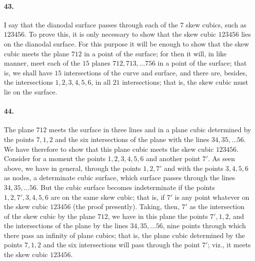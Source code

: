 \documentclass[11pt,a4paper]{article}
\begin{document}
\paragraph{43.}
I say that the dianodal surface passes through each of the $7$ skew cubics, such as
$123456$. To prove this, it is only necessary to show that the skew cubic $123456$ lies on
the dianodal surface. For this purpose it will be enough to show that the skew cubic meets
the plane $712$ in a point of the surface; for then it will, in like manner, meet each of
the $15$ planes $712, 713, \ldots 756$ in a point of the surface; that is, we shall have
$15$ intersections of the curve and surface, and there are, besides, the intersections
$1, 2, 3, 4, 5, 6$, in all $21$ intersections; that is, the skew cubic must lie on the
surface.

\paragraph{44.}
The plane $712$ meets the surface in three lines and in a plane cubic determined by the
points $7, 1, 2$ and the six intersections of the plane with the lines $34, 35, \ldots 56$.
We have therefore to show that this plane cubic meets the skew cubic $123456$. Consider for
a moment the points $1, 2, 3, 4, 5, 6$ and another point $7'$. As seen above, we have in
general, through the points $1, 2, 7'$ and with the points $3, 4, 5, 6$ as nodes, a
determinate cubic surface, which surface passes through the lines $34, 35, \ldots 56$. But
the cubic surface becomes indeterminate if the points $1, 2, 7', 3, 4, 5, 6$ are on the
same skew cubic; that is, if $7'$ is any point whatever on the skew cubic $123456$ (the
proof presently). Taking, then, $7'$ as the intersection of the skew cubic by the plane
$712$, we have in this plane the points $7', 1, 2$, and the intersections of the plane by
the lines $34, 35, \ldots 56$, nine points through which there pass an infinity of plane
cubics; that is, the plane cubic determined by the points $7, 1, 2$ and the six
intersections will pass through the point $7'$; viz., it meets the skew cubic $123456$.
\end{document}
